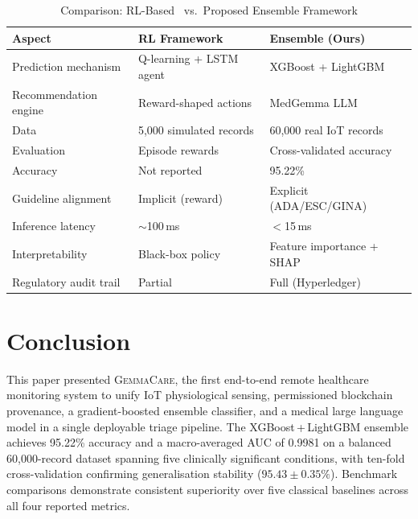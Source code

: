 \documentclass[journal]{IEEEtran}
\newcommand{\GC}{\textsc{GemmaCare}}
\begin{document}
\begin{table}[!t]
  \centering
  \caption{Comparison: RL-Based~\cite{kunveng_iot} vs.\ Proposed Ensemble Framework}
  \label{tab:vs_rl}
  \renewcommand{\arraystretch}{1.2}
  \begin{tabularx}{\linewidth}{lXX}
    \toprule
    \textbf{Aspect} & \textbf{RL Framework} & \textbf{Ensemble (Ours)} \\
    \midrule
    Prediction mechanism & Q-learning + LSTM agent & XGBoost + LightGBM \\
    Recommendation engine & Reward-shaped actions & MedGemma LLM \\
    Data & 5,000 simulated records & 60,000 real IoT records \\
    Evaluation & Episode rewards & Cross-validated accuracy \\
    Accuracy & Not reported & 95.22\% \\
    Guideline alignment & Implicit (reward) & Explicit (ADA/ESC/GINA) \\
    Inference latency & $\sim$100\,ms & $<$15\,ms \\
    Interpretability & Black-box policy & Feature importance + SHAP \\
    Regulatory audit trail & Partial & Full (Hyperledger) \\
    \bottomrule
  \end{tabularx}
\end{table}

\section{Conclusion}
\label{sec:conclusion}

This paper presented \GC{}, the first end-to-end remote healthcare
monitoring system to unify IoT physiological sensing, permissioned
blockchain provenance, a gradient-boosted ensemble classifier, and a
medical large language model in a single deployable triage pipeline.
The XGBoost\,+\,LightGBM ensemble achieves 95.22\% accuracy and a
macro-averaged AUC of 0.9981 on a balanced 60,000-record dataset spanning
five clinically significant conditions, with ten-fold cross-validation
confirming generalisation stability ($95.43 \pm 0.35\%$). Benchmark
comparisons demonstrate consistent superiority over five classical
baselines across all four reported metrics.
\end{document}
